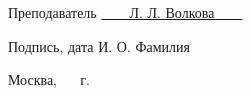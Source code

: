 \begin{titlepage}
	\vspace{0.5cm}
	
	\fontsize{12pt}{12pt}\selectfont
	\noindent\textnormal{Преподаватель} \hspace{52mm}
	\underline{\textnormal{\hphantom{~~~~~~~~~~~~~~~~~~~~~~~~~~~}}} \hspace{14mm}
	\noindent\underline{\textnormal{~~~~Л. Л. Волкова~~~~}}
	
	\vspace{2mm}
	\noindent\textnormal{\hphantom{Студент}} \hspace{17mm}\noindent
	\fontsize{8pt}{8pt}
	\hphantom{Группа}\hspace{43mm}\textnormal{Подпись, дата} \hspace{30mm}\noindent\textnormal{И. О. Фамилия}
	
	\vspace{0.5cm}
	
	\fontsize{12pt}{12pt}\selectfont
	
	\begin{center}
		\vfill
		Москва, ~\the\year
		~г.
	\end{center}
	\restoregeometry

\end{titlepage}
